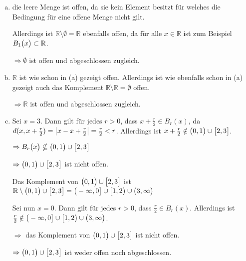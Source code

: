 \documentclass{scrreprt}
\begin{document}
\begin{enumerate}[(a)]
\item die leere Menge ist offen, da sie kein Element besitzt für welches die
  Bedingung für eine offene Menge nicht gilt.

  Allerdings ist $\mathbb{R} \setminus \emptyset = \mathbb{R}$ ebenfalls offen,
  da für alle $x \in \mathbb{R}$ ist zum Beispiel \\
  $B_1\qty\big(x) \subset \mathbb{R}$.

  $\Rightarrow \emptyset$ ist offen und abgeschlossen zugleich.

\item $\mathbb{R}$ ist wie schon in (a) gezeigt offen.
  Allerdings ist wie ebenfalls schon in (a) gezeigt auch das Komplement
  $\mathbb{R} \setminus \mathbb{R} = \emptyset$ offen.

  $\Rightarrow \mathbb{R}$ ist offen und abgeschlossen zugleich.

\item Sei $x = 3$.
  Dann gilt für jedes $r > 0$, dass $x + \frac{r}{2} \in B_r(x)$, da
  $d(x, x + \frac{r}{2}) = \abs{x - x + \frac{r}{2}} = \frac{r}{2} < r$.
  Allerdings ist $x + \frac{r}{2} \notin \qty\big(0, 1) \cup \qty\big[2, 3]$.

  $\Rightarrow B_r\qty\big(x) \nsubseteq \qty\big(0, 1) \cup \qty\big[2, 3]$

  $\Rightarrow \qty\big(0, 1) \cup \qty\big[2, 3]$ ist nicht offen.

  Das Komplement von $\qty\big(0, 1) \cup \qty\big[2, 3]$ ist
  $\mathbb{R} \setminus \qty\big(0, 1) \cup \qty\big[2, 3] =
  {\big (}-\infty, 0{\big ]} \cup {\big [}1, 2 {\big )} \cup
  \qty\big(3, \infty)$

  Sei nun $x = 0$.
  Dann gilt für jedes $r > 0$, dass $\frac{r}{2} \in B_r(x)$.
  Allerdings ist $\frac{r}{2} \notin {\big (}-\infty, 0{\big ]} \cup
  {\big [}1, 2 {\big )} \cup \qty\big(3, \infty)$.

  $\Rightarrow$ das Komplement von $\qty\big(0, 1) \cup \qty\big[2, 3]$ ist
  nicht offen.

  $\Rightarrow \qty\big(0, 1) \cup \qty\big[2, 3]$ ist weder offen noch
  abgeschlossen.


\end{enumerate}
\end{document}
